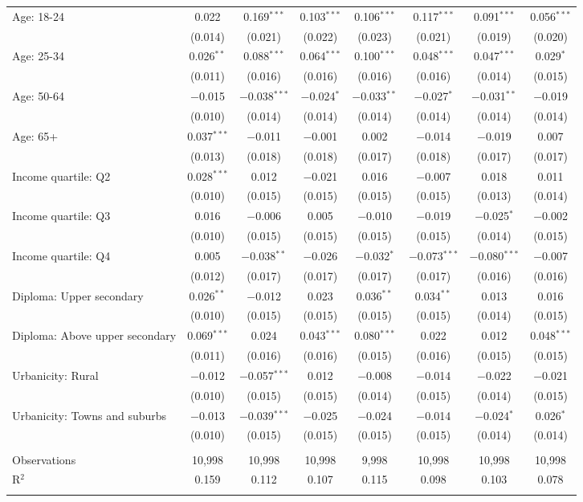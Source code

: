 \begin{tabular}{@{\extracolsep{5pt}}lccccccc}
  Age: 18\mbox{-}24 & 0.022 & 0.169$^{***}$ & 0.103$^{***}$ & 0.106$^{***}$ & 0.117$^{***}$ & 0.091$^{***}$ & 0.056$^{***}$ \\ 
  & (0.014) & (0.021) & (0.022) & (0.023) & (0.021) & (0.019) & (0.020) \\ 
  Age: 25\mbox{-}34 & 0.026$^{**}$ & 0.088$^{***}$ & 0.064$^{***}$ & 0.100$^{***}$ & 0.048$^{***}$ & 0.047$^{***}$ & 0.029$^{*}$ \\ 
  & (0.011) & (0.016) & (0.016) & (0.016) & (0.016) & (0.014) & (0.015) \\ 
  Age: 50\mbox{-}64 & $-$0.015 & $-$0.038$^{***}$ & $-$0.024$^{*}$ & $-$0.033$^{**}$ & $-$0.027$^{*}$ & $-$0.031$^{**}$ & $-$0.019 \\ 
  & (0.010) & (0.014) & (0.014) & (0.014) & (0.014) & (0.014) & (0.014) \\ 
  Age: 65+ & 0.037$^{***}$ & $-$0.011 & $-$0.001 & 0.002 & $-$0.014 & $-$0.019 & 0.007 \\ 
  & (0.013) & (0.018) & (0.018) & (0.017) & (0.018) & (0.017) & (0.017) \\ 
  Income quartile: Q2 & 0.028$^{***}$ & 0.012 & $-$0.021 & 0.016 & $-$0.007 & 0.018 & 0.011 \\ 
  & (0.010) & (0.015) & (0.015) & (0.015) & (0.015) & (0.013) & (0.014) \\ 
  Income quartile: Q3 & 0.016 & $-$0.006 & 0.005 & $-$0.010 & $-$0.019 & $-$0.025$^{*}$ & $-$0.002 \\ 
  & (0.010) & (0.015) & (0.015) & (0.015) & (0.015) & (0.014) & (0.015) \\ 
  Income quartile: Q4 & 0.005 & $-$0.038$^{**}$ & $-$0.026 & $-$0.032$^{*}$ & $-$0.073$^{***}$ & $-$0.080$^{***}$ & $-$0.007 \\ 
  & (0.012) & (0.017) & (0.017) & (0.017) & (0.017) & (0.016) & (0.016) \\ 
  Diploma: Upper secondary & 0.026$^{**}$ & $-$0.012 & 0.023 & 0.036$^{**}$ & 0.034$^{**}$ & 0.013 & 0.016 \\ 
  & (0.010) & (0.015) & (0.015) & (0.015) & (0.015) & (0.014) & (0.015) \\ 
  Diploma: Above upper secondary & 0.069$^{***}$ & 0.024 & 0.043$^{***}$ & 0.080$^{***}$ & 0.022 & 0.012 & 0.048$^{***}$ \\ 
  & (0.011) & (0.016) & (0.016) & (0.015) & (0.016) & (0.015) & (0.015) \\ 
  Urbanicity: Rural & $-$0.012 & $-$0.057$^{***}$ & 0.012 & $-$0.008 & $-$0.014 & $-$0.022 & $-$0.021 \\ 
  & (0.010) & (0.015) & (0.015) & (0.014) & (0.015) & (0.014) & (0.015) \\ 
  Urbanicity: Towns and suburbs & $-$0.013 & $-$0.039$^{***}$ & $-$0.025 & $-$0.024 & $-$0.014 & $-$0.024$^{*}$ & 0.026$^{*}$ \\ 
  & (0.010) & (0.015) & (0.015) & (0.015) & (0.015) & (0.014) & (0.014) \\ 
 \hline \\[-1.8ex] 

Observations & 10,998 & 10,998 & 10,998 & 9,998 & 10,998 & 10,998 & 10,998 \\ 
R$^{2}$ & 0.159 & 0.112 & 0.107 & 0.115 & 0.098 & 0.103 & 0.078 \\ 
\hline 
\hline \\[-1.8ex] 
\end{tabular} 